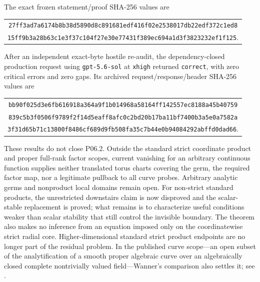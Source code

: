 The exact frozen statement/proof SHA-256 values are
\begin{center}
\small
\begin{tabular}{@{}c@{}}
\nolinkurl{27ff3ad7a6174b8b38d5890d8c891681edf416f02e2538017db22edf372c1ed8}\\
\nolinkurl{15ff9b3a28b63c1e3f37c104f27e30e77431f389ec694a1d3f3823232ef1f125}.
\end{tabular}
\end{center}
After an independent exact-byte hostile re-audit, the dependency-closed
production request using \texttt{gpt-5.6-sol} at \texttt{xhigh} returned
\texttt{correct}, with zero critical errors and zero gaps.  Its archived
request/response/header SHA-256 values are
\begin{center}
\small
\begin{tabular}{@{}c@{}}
\nolinkurl{bb90f025d3e6fb616918a364a9f1b014968a58164ff142557ec8188a45b40759}\\
\nolinkurl{839c5b3f0506f9789f2f14d5eaff8afc0c2bd20b17ba11bf7400b3a5e0a7582a}\\
\nolinkurl{3f31d65b71c13800f8486cf689d9fb508fa35c7b44e0b94084292abffd0dad66}.
\end{tabular}
\end{center}

These results do not close P06.2.  Outside the standard strict coordinate
product and proper full-rank factor scopes, current vanishing for an
arbitrary continuous function supplies neither translated torus charts
covering the germ, the required factor map, nor a legitimate pullback to all
curve probes.  Arbitrary analytic germs and nonproduct local domains remain
open.  For non-strict standard products, the unrestricted downstairs claim
is now disproved and the scalar-stable replacement is proved; what remains is
to characterize useful conditions weaker than scalar stability that still
control the invisible boundary.  The theorem also makes no inference from
an equation imposed only on the coordinatewise strict radial core.
Higher-dimensional standard strict product endpoints are no longer part of
the residual problem.  In the
published curve scope---an open subset of the analytification of a smooth
proper algebraic curve over an algebraically closed complete nontrivially
valued field---Wanner's comparison also settles it; see
.

